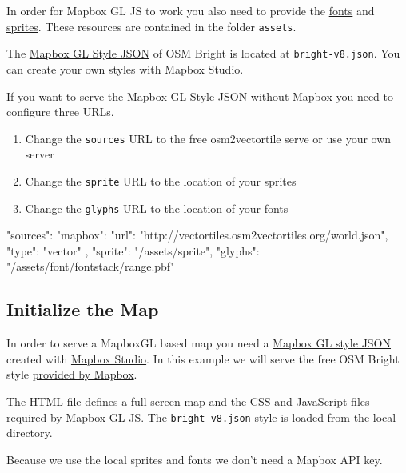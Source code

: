In order for Mapbox GL JS to work you also need to provide the
\href{https://www.mapbox.com/mapbox-gl-style-spec/\#glyphs}{fonts} and
\href{https://www.mapbox.com/mapbox-gl-style-spec/\#sprite}{sprites}.
These resources are contained in the folder \texttt{assets}.

The \href{https://www.mapbox.com/mapbox-gl-style-spec/}{Mapbox GL Style
JSON} of OSM Bright is located at \texttt{bright-v8.json}. You can
create your own styles with Mapbox Studio.

If you want to serve the Mapbox GL Style JSON without Mapbox you need to
configure three URLs.

\begin{enumerate}
\item
  Change the \texttt{sources} URL to the free osm2vectortile serve or
  use your own server
\item
  Change the \texttt{sprite} URL to the location of your sprites
\item
  Change the \texttt{glyphs} URL to the location of your fonts
\end{enumerate}

\begin{javascriptcode}
"sources": {
    "mapbox": {
        "url": "http://vectortiles.osm2vectortiles.org/world.json",
        "type": "vector"
    }
},
"sprite": "/assets/sprite",
"glyphs": "/assets/font/{fontstack}/{range}.pbf"
\end{javascriptcode}

\subsection{Initialize the Map}\label{initialize-the-map}

In order to serve a MapboxGL based map you need a
\href{https://www.mapbox.com/mapbox-gl-style-spec/}{Mapbox GL style
JSON} created with \href{https://www.mapbox.com/mapbox-studio/}{Mapbox
Studio}. In this example we will serve the free OSM Bright style
\href{https://github.com/mapbox/mapbox-gl-styles}{provided by Mapbox}.

The HTML file defines a full screen map and the CSS and JavaScript files
required by Mapbox GL JS. The \texttt{bright-v8.json} style is loaded
from the local directory.

Because we use the local sprites and fonts we don't need a Mapbox API
key.

